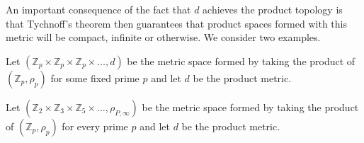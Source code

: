 An important consequence of the fact that $d$ achieves the product topology is that Tychnoff's theorem then guarantees that product spaces formed with this metric will be compact, infinite or otherwise.  We consider two examples. 

\begin{example}
	Let $(\mathbb{Z}_p \times \mathbb{Z}_p \times \mathbb{Z}_p \times \ldots, d)$ be the metric space formed by taking the product of $(\mathbb{Z}_p, \rho_p)$ for some fixed prime $p$ and let $d$ be the product metric.
\end{example}

\begin{example}
	Let $(\mathbb{Z}_2 \times \mathbb{Z}_3 \times \mathbb{Z}_5 \times \ldots, \rho_{P,\infty})$ be the metric space formed by taking the product of $(\mathbb{Z}_p, \rho_p)$ for every prime $p$ and let $d$ be the product metric.
\end{example}




